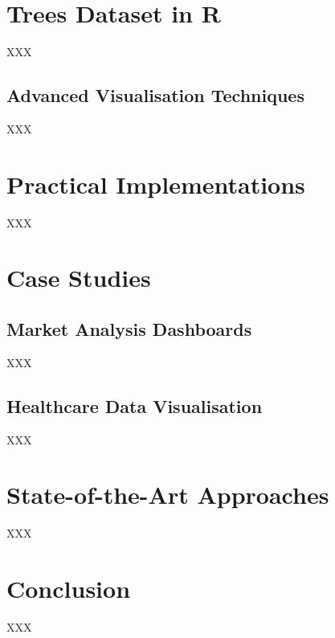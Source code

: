 \documentclass{article}\usepackage[]{graphicx}\usepackage[]{xcolor}
\begin{document}
\section{Trees Dataset in R}
XXX
\subsection{Advanced Visualisation Techniques}
XXX
\section{Practical Implementations}
XXX
\section{Case Studies}
\subsection{Market Analysis Dashboards}
XXX
\subsection{Healthcare Data Visualisation}
XXX
\section{State-of-the-Art Approaches}
XXX
\section{Conclusion}
XXX


\end{document}
